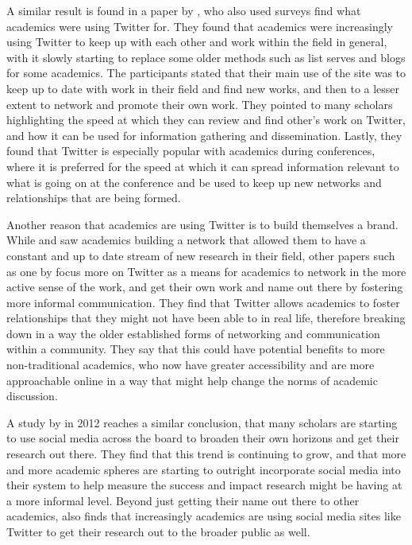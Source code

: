 \documentclass[12pt, Times New Roman]{article}
\begin{document}
A similar result is found in a paper by \citet{Gruzd}, who also used surveys find what academics were using Twitter for. They found that academics were increasingly using Twitter to keep up with each other and work within the field in general, with it slowly starting to replace some older methods such as list serves and blogs for some academics. The participants stated that their main use of the site was to keep up to date with work in their field and find new works, and then to a lesser extent to network and promote their own work. They pointed to many scholars highlighting the speed at which they can review and find other’s work on Twitter, and how it can be used for information gathering and dissemination. Lastly, they found that Twitter is especially popular with academics during conferences, where it is preferred for the speed at which it can spread information relevant to what is going on at the conference and be used to keep up new networks and relationships that are being formed.

Another reason that academics are using Twitter is to build themselves a brand. While \citet{Priem} and \citet{Gruzd} saw academics building a network that allowed them to have a constant and up to date stream of new research in their field, other papers such as one by \citet{Budge} focus more on Twitter as a means for academics to network in the more active sense of the work, and get their own work and name out there by fostering more informal communication. They find that Twitter allows academics to foster relationships that they might not have been able to in real life, therefore breaking down in a way the older established forms of networking and communication within a community. They say that this could have potential benefits to more non-traditional academics, who now have greater accessibility and are more approachable online in a way that might help change the norms of academic discussion. 

A study by \citet{Staves} in 2012 reaches a similar conclusion, that many scholars are starting to use social media across the board to broaden their own horizons and get their research out there. They find that this trend is continuing to grow, and that more and more academic spheres are starting to outright incorporate social media into their system to help measure the success and impact research might be having at a more informal level. Beyond just getting their name out there to other academics, \citet{Staves} also finds that increasingly academics are using social media sites like Twitter to get their research out to the broader public as well.
\end{document}

